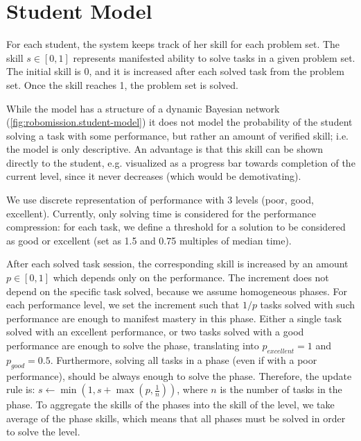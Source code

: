 \section{Student Model}
\label{sec:robomission.student}

For each student, the system keeps track of her skill for each problem set. %
The skill $s \in [0, 1]$ represents manifested ability to solve tasks in
a given problem set. The initial skill is 0, and it is increased after each solved
task from the problem set. Once the skill reaches 1, the problem set is solved.

While the model has a structure of a dynamic Bayesian network
(\cref{fig:robomission.student-model}) %
it does not model the probability of the student solving a task with some performance,
but rather an amount of verified skill;
i.e. the model is only descriptive.
An advantage is that this skill can be shown directly to the student,
e.g. visualized as a progress bar towards completion of the current level,
since it never decreases (which would be demotivating).

We use discrete representation of performance with 3 levels (poor, good,
excellent). Currently, only solving time is considered for the performance
compression: for each task, we define a threshold for a solution to be
considered as good or excellent
(set as 1.5 and 0.75 multiples of median time).

After each solved task session, the corresponding skill is increased by
an amount $p \in [0, 1]$ which depends only on the performance.
The increment does not depend on the specific task solved, because we assume homogeneous phases.
For each performance level, we set the increment such that $1/p$ tasks solved
with such performance are enough to manifest mastery in this phase.
Either a single task solved with an excellent performance, or two
tasks solved with a good performance are enough to solve the phase,
translating into $p_{excellent} = 1$ and $p_{good} = 0.5$.
Furthermore, solving all tasks in a phase (even if with a poor performance),
should be always enough to solve the phase.
Therefore, the update rule is:
$s \leftarrow \min(1, s + \max(p, \frac{1}{n}))$,
where $n$ is the number of tasks in the phase.
To aggregate the skills of the phases into the skill of the level,
we take average of the phase skills, which means
that all phases must be solved in order to solve the level.


